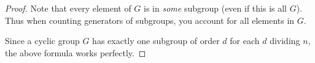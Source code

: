 \begin{proof}
  Note that every element of $G$ is in \emph{some} subgroup (even if
  this is all $G$). Thus when counting generators of subgroups, you
  account for all elements in $G$.

  Since a cyclic group $G$ has exactly one subgroup of order $d$
  for each $d$ dividing $n$, the above formula works perfectly.
\end{proof}
